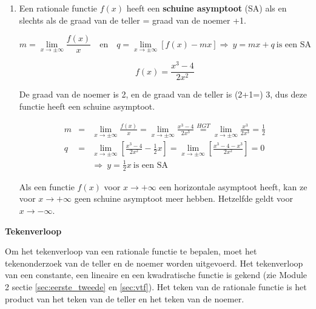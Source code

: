 \begin{enumerate}
\begin{voorbeeld}
\end{voorbeeld}

\item Een rationale functie $f(x)$ heeft een \textbf{schuine asymptoot}
(SA) als en slechts als de graad van de teller = graad van de noemer
+1.

\begin{equation*}
m=\lim_{x\to\pm\infty}\frac{f(x)}{x}\quad\textrm{en}\quad q=\lim_{x\to\pm\infty}\left[f(x)-mx\right]\Rightarrow\:y=mx+q\:\textrm{is een SA}
\end{equation*}

\begin{voorbeeld}
	\begin{equation*}
f(x)=\frac{x^{3}-4}{2x^{2}}
\end{equation*}

De graad van de noemer is 2, en de graad van de teller is (2+1=) 3,
dus deze functie heeft een schuine asymptoot.

\begin{eqnarray*}
m&=&\lim_{x\to\pm\infty}\frac{f(x)}{x}= \lim_{x\to\pm\infty}\frac{x^{3}-4}{2x^{3}}\overset{HGT}{=} \lim_{x\to\pm\infty}\frac{x^{3}}{2x^{3}}=\frac{1}{2}
\\
q&=& \lim_{x\to\pm\infty}\left[\frac{x^{3}-4}{2x^{2}}-\frac{1}{2}x\right]=\lim_{x\to\pm\infty}\left[\frac{x^{3}-4-x^{3}}{2x^{2}}\right]=0 \\
&&\Rightarrow\:y=\frac{1}{2}x\:\textrm{is een SA}
\end{eqnarray*}

\end{voorbeeld}

\begin{opmerking}
Als een functie $f(x)$ voor $x\rightarrow+\infty$ een
horizontale asymptoot heeft, kan ze voor $x\rightarrow+\infty$ geen
schuine asymptoot meer hebben. Hetzelfde geldt voor $x\rightarrow-\infty$.
\end{opmerking}
\end{enumerate}

\textbf{Tekenverloop}

Om het tekenverloop van een rationale functie te bepalen, moet het
tekenonderzoek van de teller en de noemer worden uitgevoerd. Het tekenverloop
van een constante, een lineaire en een kwadratische functie is gekend
(zie Module 2 sectie \ref{sec:eerste_tweede} en \ref{sec:vtf}).
Het teken van de rationale functie is het product van het teken van
de teller en het teken van de noemer.



